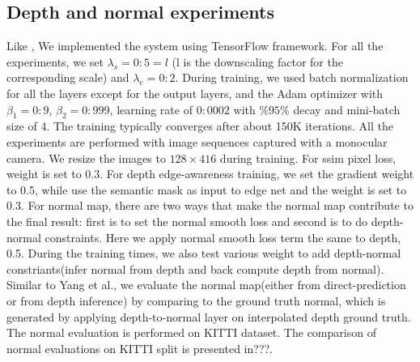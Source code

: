 \documentclass[10pt,twocolumn,letterpaper]{article}
\begin{document}
\subsection{Depth and normal experiments}
Like \cite{zhou2017unsupervised}, We implemented the system using TensorFlow framework. For all the experiments, we set $\lambda_s = 0:5=l$ (l is the downscaling factor for the corresponding scale) and $\lambda_e = 0:2$. During training, we used batch normalization for all the layers except for the output layers, and the Adam optimizer with $\beta_1 = 0:9$, $\beta_2 = 0:999$, learning rate of $0:0002$ with $\%95\%$ decay and mini-batch size of 4. The training typically converges after about 150K iterations. All the experiments are performed with image sequences captured with a monocular camera. We resize the images to $128 × 416$ during training.
For ssim pixel loss, weight is set to 0.3. For depth edge-awareness training, we set the gradient weight to 0.5, while use the semantic mask as input to edge net and the weight is set to 0.3.
For normal map, there are two ways that make the normal map contribute to the final result: first is to set the normal smooth loss and second is to do depth-normal constraints. Here we apply normal smooth loss term the same to depth, 0.5. During the training times, we also test various weight to add depth-normal constriants(infer normal from depth and back compute depth from normal).\\
Similar to Yang et al.\cite{yang2018lego}, we evaluate the normal map(either from direct-prediction or from depth inference) by comparing to the ground truth normal, which is generated by applying depth-to-normal layer on interpolated depth ground truth. The normal evaluation is performed
on KITTI dataset. The comparison of normal evaluations on KITTI split is presented in???. 
\end{document}
